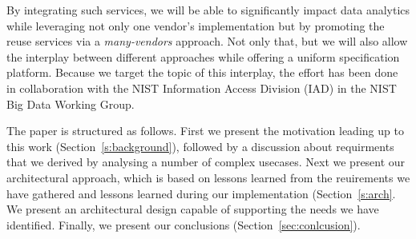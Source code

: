 By integrating such services, we will be able to significantly impact
data analytics while leveraging not only one vendor's implementation
but by promoting the reuse services via a {\em many-vendors}
approach. Not only that, but we will also allow the interplay between
different approaches while offering a uniform specification platform.
Because we target the topic of this interplay, the effort has been
done in collaboration with the NIST Information Access Division (IAD)
in the NIST Big Data Working Group.

The paper is structured as follows. First we present the motivation
leading up to this work (Section~\ref{s:background}), followed by a
discussion about requirments that we derived by analysing a number of
complex usecases. Next we present our architectural approach, which is
based on lessons learned from the reuirements we have gathered and
lessons learned during our implementation (Section~\ref{s:arch}. We
present an architectural design capable of supporting the needs we
have identified.  Finally, we present our conclusions
(Section~\ref{sec:conlcusion}).
